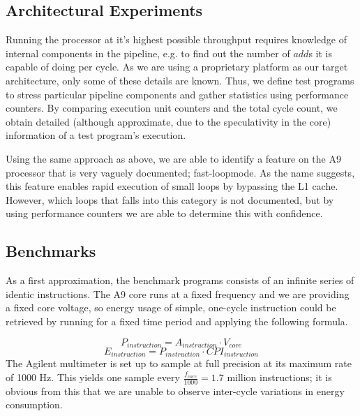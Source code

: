 \subsection{Architectural Experiments}
\label{arch_experiments}
Running the processor at it's highest possible throughput requires knowledge of
internal components in the pipeline, e.g. to find out the number of $add$s it is
capable of doing per cycle. As we are using a proprietary platform as our target
architecture, only some of these details are known. Thus, we define test
programs to stress particular pipeline components and gather statistics using
performance counters. By comparing execution unit counters and the total cycle
count, we obtain detailed (although approximate, due to the speculativity in the
core) information of a test program's execution.

Using the same approach as above, we are able to identify a feature on the A9
processor that is very vaguely documented; fast-loop\texttrademark mode. As the
name suggests, this feature enables rapid execution of small loops by bypassing
the L1 cache.  However, which loops that falls into this category is not
documented, but by using performance counters we are able to determine this with
confidence.


\subsection{Benchmarks}
As a first approximation, the benchmark programs consists of an infinite series
of identic instructions. The A9 core runs at a fixed frequency and we are
providing a fixed core voltage, so energy usage of simple, one-cycle instruction
could be retrieved by running for a fixed time period and applying the following
formula.

\begin{equation}
    P_{instruction} = A_{instruction} \cdot V_{core}
\end{equation}
\begin{equation}
    E_{instruction} = P_{instruction} \cdot CPI_{instruction}
\end{equation}
The Agilent multimeter is set up to sample at full precision at its maximum rate
of 1000 Hz. This yields one sample every $\frac{ f_{core} }{ 1000 } = 1.7$
million instructions; it is obvious from this that we are unable to observe
inter-cycle variations in energy consumption.

